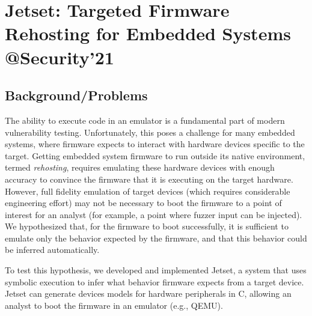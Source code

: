 \section{Jetset: Targeted Firmware Rehosting for Embedded Systems \\@Security'21}
\subsection{Background/Problems}
The ability to execute code in an emulator is a fundamental part of modern vulnerability testing. Unfortunately, this poses a challenge for many embedded systems, where firmware expects to interact with hardware devices specific to the target.  Getting embedded system firmware to run outside its native environment, termed \emph{rehosting}, requires emulating these hardware devices with enough accuracy to convince the firmware that it is executing on the target hardware. However, full fidelity emulation of target devices (which requires considerable engineering effort) may not be necessary to boot the firmware to a point of interest for an analyst (for example, a point where fuzzer input can be injected). We hypothesized that, for the firmware to boot successfully, it is sufficient to emulate only the behavior expected by the firmware, and that this behavior could be inferred automatically. 

To test this hypothesis, we developed and implemented Jetset, a system that uses symbolic execution to infer what behavior firmware expects from a target device. Jetset can generate devices models for hardware peripherals in C, allowing an analyst to boot the firmware in an emulator (e.g., QEMU). 
